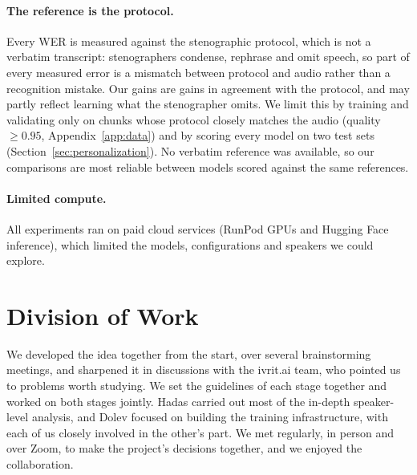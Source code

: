 \documentclass[11pt]{article}
\begin{document}
\paragraph{The reference is the protocol.} Every WER is measured against the stenographic protocol, which is not a verbatim
transcript: stenographers condense, rephrase and omit speech, so part of every
measured error is a mismatch between protocol and audio rather than a
recognition mistake. Our gains are gains in agreement with the protocol, and may
partly reflect learning what the stenographer omits. We limit this by training
and validating only on chunks whose protocol closely matches the audio
(quality $\geq 0.95$,
Appendix~\ref{app:data}) and by scoring every model on two test sets
(Section~\ref{sec:personalization}). No verbatim
reference was available, so our comparisons are most reliable between models
scored against the same references.

\paragraph{Limited compute.} All experiments ran on paid cloud services (RunPod GPUs and Hugging Face
inference), which limited the models, configurations
and speakers we could explore.



\section*{Division of Work}
\label{sec:division}

We developed the idea together from the start, over several brainstorming
meetings, and sharpened it in discussions with the ivrit.ai team, who pointed us
to problems worth studying. We set the guidelines of each stage together and worked on both stages jointly. Hadas carried out most
of the in-depth speaker-level analysis, and Dolev focused on building the
training infrastructure, with each of us closely involved in the other's part.
We met regularly, in person and over Zoom, to make the
project's decisions together, and we enjoyed the collaboration.


\end{document}
